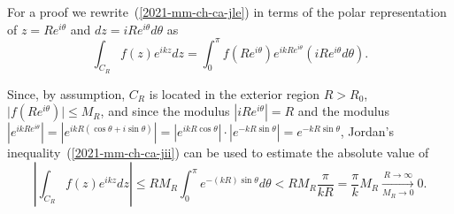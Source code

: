 {\color{OliveGreen}
\bproof
For a proof we rewrite~(\ref{2021-mm-ch-ca-jle})
in terms of the polar representation of  $z=R e^{i \theta}$ and $dz = i R e^{i \theta} d\theta$ as
\begin{equation}
\label{2021-mm-ch-ca-jlp1}
\int_{C_R} f(z) e^{ikz} dz
=
\int_0^\pi f \left( R e^{i \theta} \right) e^{ik R e^{i \theta}} \left(i R e^{i \theta} d\theta \right)
.
\end{equation}


Since, by assumption, $C_R$ is located in the exterior region $R>R_0$,
$ \vert f \left( R e^{i \theta} \right) \vert \le M_R$,
and since the modulus
$\left|i R e^{i \theta}  \right|= R$
and the modulus
$
\left| e^{ik R e^{i \theta}}\right|
=
\left| e^{ik R \left(\cos \theta + i \sin \theta \right) }\right|
=
\left| e^{ik R \cos \theta}\right| \cdot
\left| e^{-k R  \sin \theta }\right|
=
 e^{-k R  \sin \theta }
$,
Jordan's inequality~(\ref{2021-mm-ch-ca-jii}) can be used to estimate the absolute value of
\begin{equation}
\label{2021-mm-ch-ca-jlp2}
\left|\int_{C_R} f(z) e^{ikz} dz \right|
\le
R M_R
\int_0^\pi e^{- (k R) \sin \theta} d \theta < R M_R \frac{\pi}{k R}   = \frac{\pi}{k} M_R
\underset{M_R\rightarrow 0}{\xrightarrow{R\rightarrow \infty}}
0.
\end{equation}

\eproof
}


\begin{center}
{\color{olive}   \Huge
 \floweroneright
}
\end{center}
